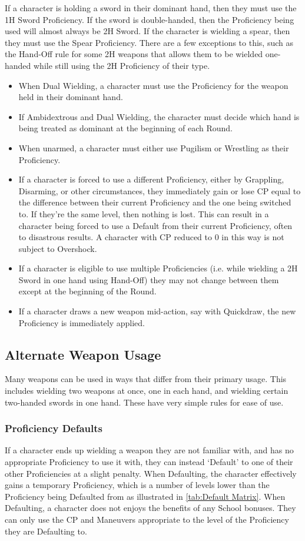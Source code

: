 \documentclass[oneside,11pt,english]{book}
\begin{document}
If a character is holding a sword in their dominant hand, then they must use the
1H Sword Proficiency. If the sword is double-handed, then the Proficiency being
used will almost always be 2H Sword. If the character is wielding a spear, then
they must use the Spear Proficiency. There are a few exceptions to this, such as
the Hand-Off rule for some 2H weapons that allows them to be wielded one-handed
while still using the 2H Proficiency of their type.
\begin{itemize}
\item When Dual Wielding, a character must use the Proficiency for the weapon
  held in their dominant hand.
\item If Ambidextrous and Dual Wielding, the character must decide which hand is
  being treated as dominant at the beginning of each Round.
\item When unarmed, a character must either use Pugilism or Wrestling as their
  Proficiency.
\item If a character is forced to use a different Proficiency, either by
  Grappling, Disarming, or other circumstances, they immediately gain or lose CP
  equal to the difference between their current Proficiency and the one being
  switched to. If they’re the same level, then nothing is lost. This can result
  in a character being forced to use a Default from their current Proficiency,
  often to disastrous results. A character with CP reduced to 0 in this way is
  not subject to Overshock.
\item If a character is eligible to use multiple Proficiencies (i.e. while
  wielding a 2H Sword in one hand using Hand-Off) they may not change between
  them except at the beginning of the Round. 
\item If a character draws a new weapon mid-action, say with Quickdraw, the new
  Proficiency is immediately applied.
\end{itemize}

\subsection{Alternate Weapon Usage}
Many weapons can be used in ways that differ from their primary usage. This
includes wielding two weapons at once, one in each hand, and wielding certain
two-handed swords in one hand. These have very simple rules for ease of use.

\subsubsection{Proficiency Defaults}
If a character ends up wielding a weapon they are not familiar with, and has no
appropriate Proficiency to use it with, they can instead ‘Default’ to one of
their other Proficiencies at a slight penalty. When Defaulting, the character
effectively gains a temporary Proficiency, which is a number of levels lower
than the Proficiency being Defaulted from as illustrated in \autoref{tab:Default
  Matrix}. When Defaulting, a character does not enjoys the benefits of any
School bonuses. They can only use the CP and Maneuvers appropriate to the level
of the Proficiency they are Defaulting to.  
\end{document}
